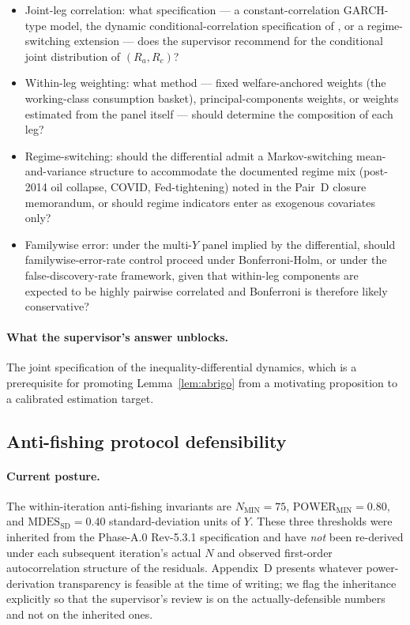 \begin{itemize}
  \item Joint-leg correlation: what specification --- a constant-correlation
    GARCH-type model, the dynamic conditional-correlation specification of
    \citet{engle_2002}, or a regime-switching extension --- does the
    supervisor recommend for the conditional joint distribution of
    \((R_a, R_c)\)?
  \item Within-leg weighting: what method --- fixed welfare-anchored weights
    (the working-class consumption basket), principal-components weights,
    or weights estimated from the panel itself --- should determine the
    composition of each leg?
  \item Regime-switching: should the differential admit a
    Markov-switching mean-and-variance structure to accommodate the
    documented regime mix (post-2014 oil collapse, COVID,
    Fed-tightening) noted in the Pair~D closure memorandum, or should
    regime indicators enter as exogenous covariates only?
  \item Familywise error: under the multi-\(Y\) panel implied by the
    differential, should familywise-error-rate control proceed under
    Bonferroni-Holm, or under the false-discovery-rate framework, given
    that within-leg components are expected to be highly pairwise
    correlated and Bonferroni is therefore likely conservative?
\end{itemize}

\paragraph{What the supervisor's answer unblocks.} The joint
specification of the inequality-differential dynamics, which is a
prerequisite for promoting Lemma~\ref{lem:abrigo} from a motivating
proposition to a calibrated estimation target.

\subsection{Anti-fishing protocol defensibility}\label{sec:7.4}

\paragraph{Current posture.} The within-iteration anti-fishing
invariants are
\(N_{\text{MIN}} = 75\),
\(\mathrm{POWER}_{\text{MIN}} = 0.80\), and
\(\mathrm{MDES}_{\text{SD}} = 0.40\) standard-deviation units of \(Y\).
These three thresholds were inherited from the Phase-A.0 Rev-5.3.1
specification and have \emph{not} been re-derived under each subsequent
iteration's actual \(N\) and observed first-order autocorrelation
structure of the residuals. Appendix~D presents whatever
power-derivation transparency is feasible at the time of writing; we
flag the inheritance explicitly so that the supervisor's review is on the
actually-defensible numbers and not on the inherited ones.

